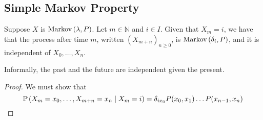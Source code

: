 \subsection{Simple Markov Property}
\begin{theorem}
Suppose \( X \) is \( \operatorname{Markov}\left({\lambda, P}\right) \).
Let \( m \in \mathbb N \) and \( i \in I \).
Given that \( X_m = i \), we have that the process after time \( m \), written \( (X_{m+n})_{n \geq 0} \), is \( \operatorname{Markov}\left({\delta_i, P}\right) \), and it is independent of \( X_0, \dots, X_n \).
\end{theorem}
\noindent Informally, the past and the future are independent given the present.
\begin{proof}
We must show that
\[ \mathbb{P}\left({X_m = x_0, \dots, X_{m+n} = x_n \mid X_m = i}\right) = \delta_{i x_0} P(x_0, x_1) \dots P(x_{n-1}, x_n) \]
\end{proof}

